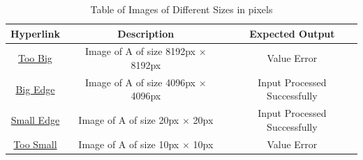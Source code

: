 \documentclass[12pt, titlepage]{article}
\begin{document}
\begin{table}[h!]
  \centering
  \begin{tabular}{|c|c|c|}
    \hline
    \textbf{Hyperlink} & \textbf{Description} & \textbf{Expected Output} \\ \hline
    \href{https://github.com/cer-hunter/OAR-CAS741/tree/main/tests/test-images/toobig.png}{Too Big} & Image of A of size 8192px $\times$ 8192px & Value Error \\ \hline
    \href{https://github.com/cer-hunter/OAR-CAS741/tree/main/tests/test-images/big.png}{Big Edge} & Image of A of size 4096px $\times$ 4096px & Input Processed Successfully \\ \hline
    \href{https://github.com/cer-hunter/OAR-CAS741/tree/main/tests/test-images/small.png}{Small Edge} & Image of A of size 20px $\times$ 20px & Input Processed Successfully \\ \hline
    \href{https://github.com/cer-hunter/OAR-CAS741/tree/main/tests/test-images/toosmall.png}{Too Small} & Image of A of size 10px $\times$ 10px & Value Error \\ \hline
  \end{tabular}
  \caption{Table of Images of Different Sizes in pixels}
  \label{table_size}
\end{table}
\end{document}
